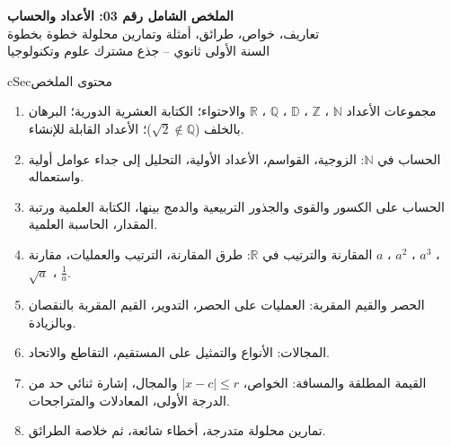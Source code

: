 \documentclass[12pt,a4paper]{article}
\newenvironment{BOX}[2]{\begin{otherlanguage}{english}\begin{arbox}{#1}{#2}}{\end{arbox}\end{otherlanguage}}
\newenvironment{LTR}{\begin{otherlanguage}{english}}{\end{otherlanguage}}
\newcommand{\N}{\mathbb{N}}
\newcommand{\Z}{\mathbb{Z}}
\newcommand{\D}{\mathbb{D}}
\newcommand{\Q}{\mathbb{Q}}
\newcommand{\R}{\mathbb{R}}
\begin{document}
\begin{LTR}
\begin{tcolorbox}[enhanced,colback=cSec,colframe=cSec,arc=3mm,colupper=white,halign=center,boxrule=0pt,top=12pt,bottom=12pt,before upper={\selectlanguage{arabic}}]
{\color{white}\fontsize{25}{31}\selectfont\bfseries الملخص الشامل رقم 03: الأعداد والحساب}\\[8pt]
{\color{white}\large تعاريف، خواص، طرائق، أمثلة وتمارين محلولة خطوة بخطوة}\\[5pt]
{\color{white}\large السنة الأولى ثانوي -- جذع مشترك علوم وتكنولوجيا}
\end{tcolorbox}
\end{LTR}

\begin{BOX}{cSec}{محتوى الملخص}
\begin{enumerate}[label=\textbf{\arabic*.}]
\item مجموعات الأعداد $\N$ ، $\Z$ ، $\D$ ، $\Q$ ، $\R$ والاحتواء؛ الكتابة العشرية الدورية؛ البرهان بالخلف ($\sqrt{2}\notin\Q$)؛ الأعداد القابلة للإنشاء.
\item الحساب في $\N$: الزوجية، القواسم، الأعداد الأولية، التحليل إلى جداء عوامل أولية واستعماله.
\item الحساب على الكسور والقوى والجذور التربيعية والدمج بينها، الكتابة العلمية ورتبة المقدار، الحاسبة العلمية.
\item المقارنة والترتيب في $\R$: طرق المقارنة، الترتيب والعمليات، مقارنة $a$ ، $a^{2}$ ، $a^{3}$ ، $\sqrt{a}$ ، $\frac{1}{a}$.
\item الحصر والقيم المقربة: العمليات على الحصر، التدوير، القيم المقربة بالنقصان وبالزيادة.
\item المجالات: الأنواع والتمثيل على المستقيم، التقاطع والاتحاد.
\item القيمة المطلقة والمسافة: الخواص، $|x-c|\leqslant r$ والمجال، إشارة ثنائي حد من الدرجة الأولى، المعادلات والمتراجحات.
\item تمارين محلولة متدرجة، أخطاء شائعة، ثم خلاصة الطرائق.
\end{enumerate}
\end{BOX}

\end{document}
